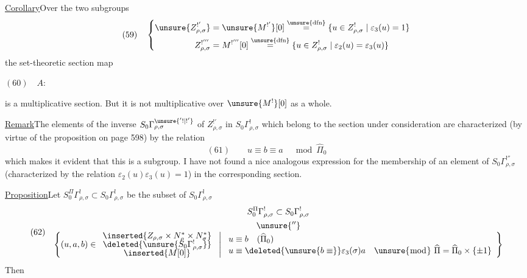 \uline{Corollary}\quad Over the two subgroups
\[
(59)\quad\left\{\begin{aligned}
\unsure{Z_{\rho,\sigma}^{!'}}&=\unsure{M^{!'}}[0]
\overset{\unsure{\mathrm{dfn}}}{=}
\{u\in Z_{\rho,\sigma}^{!}\mid\varepsilon_3(u)=1\}\\
Z_{\rho,\sigma}^{!'''}&=M^{!'''}[0]
\overset{\unsure{\mathrm{dfn}}}{=}
\{u\in Z_{\rho,\sigma}^{!}\mid\varepsilon_2(u)=\varepsilon_3(u)\}
\end{aligned}\right.
\]
the set-theoretic section map

\begin{samepage}
$(60)\quad A:$
\end{samepage}

is a multiplicative section. But it is not multiplicative
over $\unsure{M^{!}}[0]$ as a whole.

\uline{Remark}\quad The elements of the inverse 
$S_0\Gamma_{\rho,\sigma}^{\unsure{'!|!'}}$ of $Z_{\rho,\sigma}^{!'}$
in $S_0\Gamma_{\rho,\sigma}^{!}$ which belong to the section under consideration
are characterized (by virtue of the proposition on page 598) by the relation
\[
(61)\qquad u\equiv b\equiv a\quad\bmod\widehat\Pi_0
\]
which makes it evident that this is a subgroup.
I have not found a nice analogous expression for the membership of an
element of $S_0\Gamma_{\rho,\sigma}^{!''}$
(characterized by the relation $\varepsilon_2(u)\varepsilon_3(u)=1$)
in the corresponding section.

\uline{Proposition}\quad Let
$S_0^\Pi\Gamma_{\rho,\sigma}^{!}\subset S_0\Gamma_{\rho,\sigma}^{!}$
be the subset of $S_0\Gamma_{\rho,\sigma}^{!}$
\[
(62)\quad
\begin{gathered}
S_0^\Pi\Gamma_{\rho,\sigma}^{!}\subset S_0\Gamma_{\rho,\sigma}^{!}\\
\unsure{''}\\[-1ex]
\left\{(u,a,b)\in
\begin{array}{c}
\inserted{Z_{\rho,\sigma}\times N_\rho^*\times N_\sigma^*}\\[-.5ex]
\deleted{\unsure{S_0\Gamma_{\rho,\sigma}^{!}}}\\[-.5ex]
\inserted{M[0]}
\end{array}
\ \middle|\ 
\begin{array}{l}
u\equiv b\quad(\widehat\Pi_0)\\
u\equiv\deleted{\unsure{b\equiv}}\varepsilon_3(\sigma)a\quad
\unsure{\bmod}\ \widehat\Pi=\widehat\Pi_0\times\{\pm1\}
\end{array}
\right\}
\end{gathered}
\]
Then

